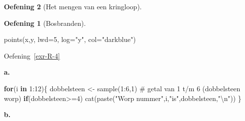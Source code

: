 \documentclass[
  a4paper,
]{scrbook}
\newenvironment{Shaded}{\begin{snugshade}}{\end{snugshade}}
\newcommand{\AttributeTok}[1]{\textcolor[rgb]{0.40,0.45,0.13}{#1}}
\newcommand{\CommentTok}[1]{\textcolor[rgb]{0.37,0.37,0.37}{#1}}
\newcommand{\ControlFlowTok}[1]{\textcolor[rgb]{0.00,0.23,0.31}{\textbf{#1}}}
\newcommand{\DecValTok}[1]{\textcolor[rgb]{0.68,0.00,0.00}{#1}}
\newcommand{\FunctionTok}[1]{\textcolor[rgb]{0.28,0.35,0.67}{#1}}
\newcommand{\NormalTok}[1]{\textcolor[rgb]{0.00,0.23,0.31}{#1}}
\newcommand{\OtherTok}[1]{\textcolor[rgb]{0.00,0.23,0.31}{#1}}
\newcommand{\SpecialCharTok}[1]{\textcolor[rgb]{0.37,0.37,0.37}{#1}}
\newcommand{\StringTok}[1]{\textcolor[rgb]{0.13,0.47,0.30}{#1}}
\theoremstyle{definition}
\newtheorem{exercise}{Oefening}[chapter]
\theoremstyle{remark}
\begin{document}
\begin{exercise}[Het mengen van een
kringloop]
\begin{exercise}[Bosbranden]
\begin{Shaded}
\begin{Highlighting}[]
\FunctionTok{points}\NormalTok{(x,y, }\AttributeTok{lwd=}\DecValTok{5}\NormalTok{, }\AttributeTok{log=}\StringTok{"y"}\NormalTok{, }\AttributeTok{col=}\StringTok{"darkblue"}\NormalTok{) }
\end{Highlighting}
\end{Shaded}

Oefening~\ref{exr-R-4}

\textbf{a.}

\begin{Shaded}
\begin{Highlighting}[]
\ControlFlowTok{for}\NormalTok{(i }\ControlFlowTok{in} \DecValTok{1}\SpecialCharTok{:}\DecValTok{12}\NormalTok{)\{}
\NormalTok{  dobbelsteen }\OtherTok{\textless{}{-}} \FunctionTok{sample}\NormalTok{(}\DecValTok{1}\SpecialCharTok{:}\DecValTok{6}\NormalTok{,}\DecValTok{1}\NormalTok{) }\CommentTok{\# getal van 1 t/m 6 (dobbelsteen worp)}
  \ControlFlowTok{if}\NormalTok{(dobbelsteen}\SpecialCharTok{\textgreater{}=}\DecValTok{4}\NormalTok{) }\FunctionTok{cat}\NormalTok{(}\FunctionTok{paste}\NormalTok{(}\StringTok{"Worp nummer"}\NormalTok{,i,}\StringTok{"is"}\NormalTok{,dobbelsteen,}\StringTok{"}\SpecialCharTok{\textbackslash{}n}\StringTok{"}\NormalTok{))}
\NormalTok{\}}
\end{Highlighting}
\end{Shaded}

\textbf{b.}


\end{exercise}
\end{exercise}
\end{document}
